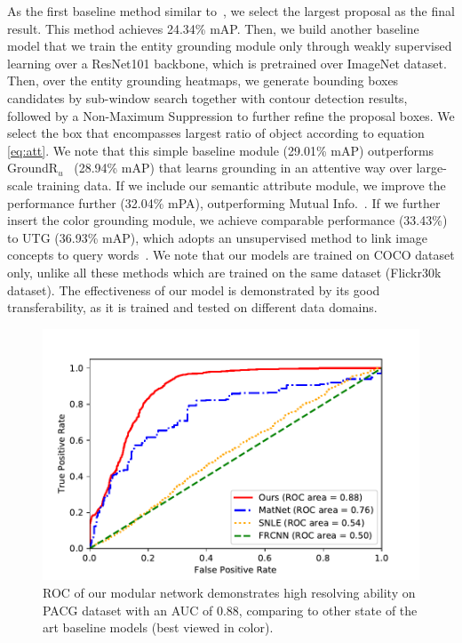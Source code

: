 As the first baseline method similar to~\citep{yeh2018unsupervised},
we select the largest proposal as the final result.
This method achieves 24.34\% mAP.
Then, we build another baseline model that
we train the entity grounding module only through weakly supervised learning over a ResNet101 backbone, which is pretrained over ImageNet dataset. Then, over the entity grounding heatmaps,
we generate bounding boxes candidates by sub-window search \citep{lampert2009efficient} together with contour detection results, followed by a Non-Maximum Suppression to further refine the proposal boxes. We select the box that encompasses largest ratio of object according to equation \ref{eq:att}. We note that this simple baseline module (29.01\% mAP) outperforms GroundR$_{u}$~\citep{rohrbach2016grounding} (28.94\% mAP) that learns grounding in an attentive way over large-scale training data.
If we include our semantic attribute module,
we improve the performance further (32.04\% mPA),
outperforming Mutual Info.~\citep{zitnick2013learning}. If we further insert the color grounding module,
we achieve comparable performance (33.43\%) to UTG (36.93\% mAP),
which adopts an unsupervised method to link image concepts to query words~\citep{yeh2018unsupervised}.
We note that our models are trained on COCO dataset only,
unlike all these methods which are trained on the same dataset (Flickr30k dataset).
The effectiveness of our model is demonstrated by its good transferability, as it is trained and tested
on different data domains.


\begin{figure}[t]
\begin{center}
\includegraphics[width=1.1\linewidth]{images/roc}
\end{center}
\caption{ROC of our modular network demonstrates high resolving ability on PACG dataset with an AUC of 0.88, comparing to other state of the art baseline models (best viewed in color).  }
\label{fig:roc}
\end{figure}

